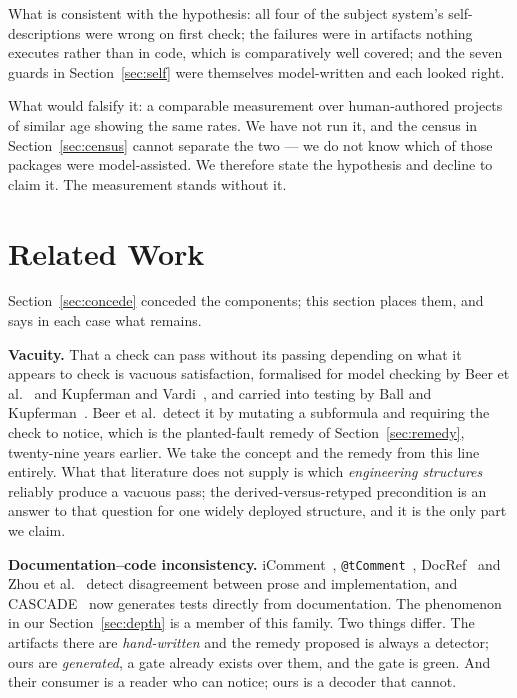 \documentclass[10pt,journal,compsoc]{IEEEtran}
\begin{document}
What is consistent with the hypothesis: all four of the subject system's
self-descriptions were wrong on first check; the failures were in artifacts nothing
executes rather than in code, which is comparatively well covered; and the seven guards
in Section~\ref{sec:self} were themselves model-written and each looked right.

What would falsify it: a comparable measurement over human-authored projects of similar
age showing the same rates. We have not run it, and the census in
Section~\ref{sec:census} cannot separate the two --- we do not know which of those
\factEcoPackages{} packages were model-assisted. We therefore state the hypothesis and
decline to claim it. The measurement stands without it.

\section{Related Work}\label{sec:related}

Section~\ref{sec:concede} conceded the components; this section places them, and says in each
case what remains.

\textbf{Vacuity.} That a check can pass without its passing depending on what it appears to
check is vacuous satisfaction, formalised for model checking by Beer et
al.~\cite{beer1997vacuity,beer2001vacuity} and Kupferman and
Vardi~\cite{kupferman2003vacuity}, and carried into testing by Ball and
Kupferman~\cite{ball2008vacuitytesting}. Beer et al.\ detect it by mutating a subformula and
requiring the check to notice, which is the planted-fault remedy of
Section~\ref{sec:remedy}, twenty-nine years earlier. We take the concept and the remedy from
this line entirely. What that literature does not supply is which \emph{engineering structures}
reliably produce a vacuous pass; the derived-versus-retyped precondition is an answer to that
question for one widely deployed structure, and it is the only part we claim.

\textbf{Documentation--code inconsistency.} iComment~\cite{tan2007icomment},
\texttt{@tComment}~\cite{tan2012tcomment}, DocRef~\cite{zhong2013docerrors} and Zhou et
al.~\cite{zhou2017directivedefects} detect disagreement between prose and implementation, and
CASCADE~\cite{kiecker2026cascade} now generates tests directly from documentation. The
phenomenon in our Section~\ref{sec:depth} is a member of this family. Two things differ. The
artifacts there are \emph{hand-written} and the remedy proposed is always a detector; ours are
\emph{generated}, a gate already exists over them, and the gate is green. And their consumer is
a reader who can notice; ours is a decoder that cannot.
\end{document}
